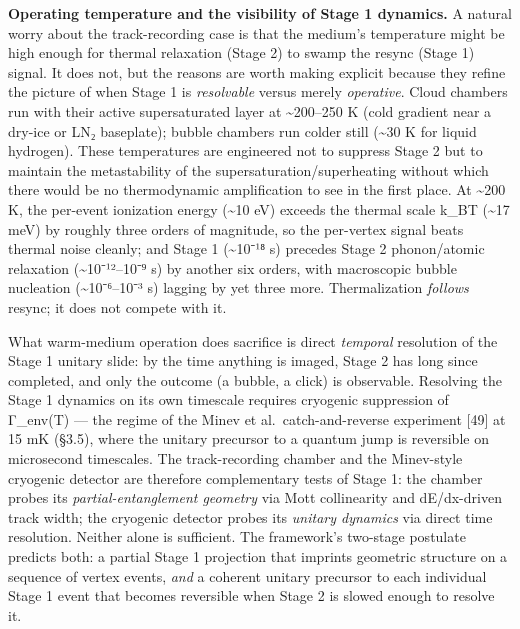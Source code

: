 \documentclass[
]{article}
\begin{document}
\textbf{Operating temperature and the visibility of Stage 1 dynamics.} A
natural worry about the track-recording case is that the medium's
temperature might be high enough for thermal relaxation (Stage 2) to
swamp the resync (Stage 1) signal. It does not, but the reasons are
worth making explicit because they refine the picture of when Stage 1 is
\emph{resolvable} versus merely \emph{operative}. Cloud chambers run
with their active supersaturated layer at \textasciitilde200--250 K
(cold gradient near a dry-ice or LN₂ baseplate); bubble chambers run
colder still (\textasciitilde30 K for liquid hydrogen). These
temperatures are engineered not to suppress Stage 2 but to maintain the
metastability of the supersaturation/superheating without which there
would be no thermodynamic amplification to see in the first place. At
\textasciitilde200 K, the per-event ionization energy (\textasciitilde10
eV) exceeds the thermal scale k\_BT (\textasciitilde17 meV) by roughly
three orders of magnitude, so the per-vertex signal beats thermal noise
cleanly; and Stage 1 (\textasciitilde10⁻¹⁸ s) precedes Stage 2
phonon/atomic relaxation (\textasciitilde10⁻¹²--10⁻⁹ s) by another six
orders, with macroscopic bubble nucleation (\textasciitilde10⁻⁶--10⁻³ s)
lagging by yet three more. Thermalization \emph{follows} resync; it does
not compete with it.

What warm-medium operation does sacrifice is direct \emph{temporal}
resolution of the Stage 1 unitary slide: by the time anything is imaged,
Stage 2 has long since completed, and only the outcome (a bubble, a
click) is observable. Resolving the Stage 1 dynamics on its own
timescale requires cryogenic suppression of Γ\_env(T) --- the regime of
the Minev et al.~catch-and-reverse experiment {[}49{]} at 15 mK (§3.5),
where the unitary precursor to a quantum jump is reversible on
microsecond timescales. The track-recording chamber and the Minev-style
cryogenic detector are therefore complementary tests of Stage 1: the
chamber probes its \emph{partial-entanglement geometry} via Mott
collinearity and dE/dx-driven track width; the cryogenic detector probes
its \emph{unitary dynamics} via direct time resolution. Neither alone is
sufficient. The framework's two-stage postulate predicts both: a partial
Stage 1 projection that imprints geometric structure on a sequence of
vertex events, \emph{and} a coherent unitary precursor to each
individual Stage 1 event that becomes reversible when Stage 2 is slowed
enough to resolve it.
\end{document}
